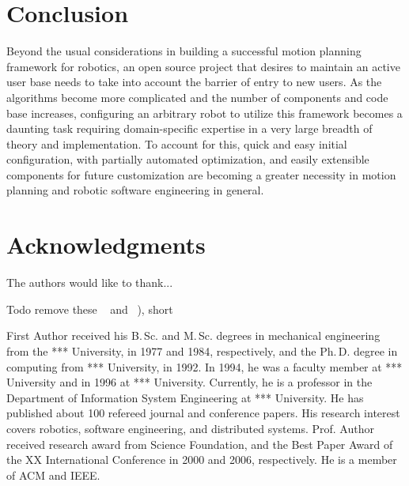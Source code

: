 \documentclass[10pt,journal,compsoc]{joser1}
\begin{document}
{\section{Conclusion}
Beyond the usual considerations in building a successful motion planning framework for robotics, an open source project that desires to maintain an active user base needs to take into account the barrier of entry to new users. As the algorithms become more complicated and the number of components and code base increases, configuring an arbitrary robot to utilize this framework becomes a daunting task requiring domain-specific expertise in a very large breadth of theory and implementation. To account for this, quick and easy initial configuration, with partially automated optimization, and easily extensible components for future customization are becoming a greater necessity in motion planning and robotic software engineering in general. 

\section*{Acknowledgments}
The authors would like to thank...

Todo remove these ~\cite{IJSEK1996:Stewart, SEER2007:Vaughan, ROBIO2006:Friedmann,
SIMPAR2008:Petters} and ~\cite{JARS2006:Colon, IJAR2001:Zielinski,
IEEE-TSE1997:Stewart, ICIAS2008:Spexard,
IROS2003:Montemerlo}), short







\begin{IEEEbiography}[{coleman}]{First Author}
received his B.\,Sc. and
M.\,Sc. degrees in mechanical engineering from the *** University,
in 1977 and 1984, respectively, and the Ph.\,D. degree in
computing from *** University, in 1992. In 1994, he was a
faculty member at *** University and in 1996 at ***
University. Currently, he is a professor in the Department of
Information System Engineering at *** University.
He has published about 100 refereed journal and conference papers.
His research interest covers robotics, software engineering, and distributed systems.
Prof. Author received research award from Science Foundation, and
the Best Paper Award of the XX International Conference in 2000 and
2006, respectively. He is a member of ACM and IEEE.
\end{IEEEbiography}

}
\end{document}
